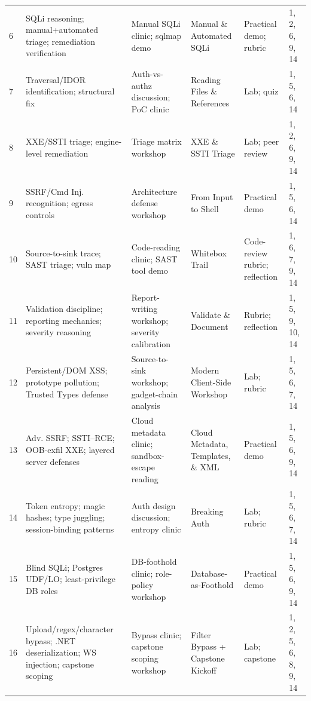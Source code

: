 \documentclass[11pt,letterpaper,oneside]{report}
\begin{document}
\begin{landscape}
\begin{longtable}{@{}R{0.45cm} R{4.40cm} R{4.30cm} R{3.95cm} R{3.95cm} R{3.70cm}@{}}
6 & SQLi reasoning; manual+automated triage; remediation verification
  & Manual SQLi clinic; sqlmap demo
  & Manual \& Automated SQLi
  & Practical demo; rubric
  & 1, 2, 6, 9, 14\\

7 & Traversal/IDOR identification; structural fix
  & Auth-vs-authz discussion; PoC clinic
  & Reading Files \& References
  & Lab; quiz
  & 1, 5, 6, 14\\

8 & XXE/SSTI triage; engine-level remediation
  & Triage matrix workshop
  & XXE \& SSTI Triage
  & Lab; peer review
  & 1, 2, 6, 9, 14\\

9 & SSRF/Cmd Inj. recognition; egress controls
  & Architecture defense workshop
  & From Input to Shell
  & Practical demo
  & 1, 5, 6, 14\\

10 & Source-to-sink trace; SAST triage; vuln map
  & Code-reading clinic; SAST tool demo
  & Whitebox Trail
  & Code-review rubric; reflection
  & 1, 6, 7, 9, 14\\

11 & Validation discipline; reporting mechanics; severity reasoning
  & Report-writing workshop; severity calibration
  & Validate \& Document
  & Rubric; reflection
  & 1, 5, 9, 10, 14\\

12 & Persistent/DOM XSS; prototype pollution; Trusted Types defense
  & Source-to-sink workshop; gadget-chain analysis
  & Modern Client-Side Workshop
  & Lab; rubric
  & 1, 5, 6, 7, 14\\

13 & Adv. SSRF; SSTI--RCE; OOB-exfil XXE; layered server defenses
  & Cloud metadata clinic; sandbox-escape reading
  & Cloud Metadata, Templates, \& XML
  & Practical demo
  & 1, 5, 6, 9, 14\\

14 & Token entropy; magic hashes; type juggling; session-binding patterns
  & Auth design discussion; entropy clinic
  & Breaking Auth
  & Lab; rubric
  & 1, 5, 6, 7, 14\\

15 & Blind SQLi; Postgres UDF/LO; least-privilege DB roles
  & DB-foothold clinic; role-policy workshop
  & Database-as-Foothold
  & Practical demo
  & 1, 5, 6, 9, 14\\

16 & Upload/regex/character bypass; .NET deserialization; WS injection; capstone scoping
  & Bypass clinic; capstone scoping workshop
  & Filter Bypass + Capstone Kickoff
  & Lab; capstone
  & 1, 2, 5, 6, 8, 9, 14\\
\end{longtable}
\end{landscape}
\end{document}

